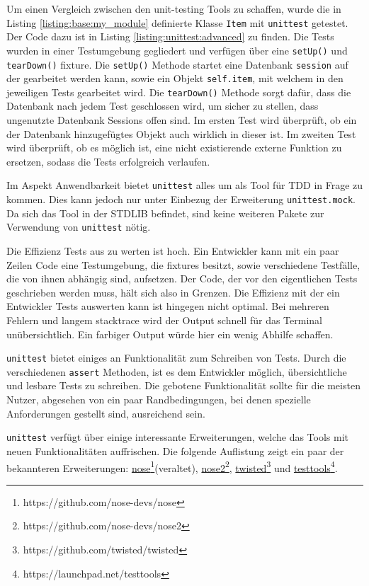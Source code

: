 Um einen Vergleich zwischen den unit-testing Tools zu schaffen, wurde die in
Listing \ref{listing:base:my_module} definierte Klasse \lstinline{Item} mit
\lstinline{unittest} getestet. Der Code dazu ist in Listing
\ref{listing:unittest:advanced} zu finden.
Die Tests wurden in einer Testumgebung gegliedert und verfügen über eine
\lstinline{setUp()} und \lstinline{tearDown()} \Gls{fixture}. Die
\lstinline{setUp()} Methode startet eine Datenbank \lstinline{session} auf der
gearbeitet werden kann, sowie ein Objekt \lstinline{self.item}, mit welchem in
den jeweiligen Tests gearbeitet wird. Die \lstinline{tearDown()} Methode
sorgt dafür, dass die Datenbank nach jedem Test geschlossen wird, um sicher zu 
stellen, dass ungenutzte Datenbank Sessions offen sind. Im ersten Test wird 
überprüft, ob ein der Datenbank hinzugefügtes Objekt auch wirklich in dieser 
ist. Im zweiten Test wird überprüft, ob es möglich ist, eine nicht existierende 
externe Funktion zu ersetzen, sodass die Tests erfolgreich verlaufen.
\newline

Im Aspekt Anwendbarkeit bietet \lstinline|unittest| alles um als Tool für TDD in
Frage zu kommen. Dies kann jedoch nur unter Einbezug der Erweiterung
\lstinline|unittest.mock|. Da sich das Tool in der STDLIB befindet, sind keine
weiteren Pakete zur Verwendung von \lstinline{unittest} nötig.

Die Effizienz Tests aus zu werten ist hoch. Ein Entwickler kann mit ein paar
Zeilen Code eine Testumgebung, die \Glspl{fixture} besitzt, sowie verschiedene 
Testfälle, die von ihnen abhängig sind, aufsetzen. Der Code, der vor den 
eigentlichen Tests geschrieben werden muss, hält sich also in Grenzen. Die
Effizienz mit der ein Entwickler Tests auswerten kann ist hingegen nicht 
optimal. Bei mehreren Fehlern und langem \gls{stacktrace} wird der Output 
schnell für das Terminal unübersichtlich. Ein farbiger Output 
würde hier 
ein wenig Abhilfe schaffen.

\lstinline{unittest} bietet einiges an Funktionalität zum Schreiben von Tests.
Durch die verschiedenen \lstinline{assert} Methoden, ist es dem Entwickler
möglich, übersichtliche und lesbare Tests zu schreiben. Die gebotene
Funktionalität sollte für die meisten Nutzer, abgesehen von ein paar
Randbedingungen, bei denen spezielle Anforderungen  gestellt sind, ausreichend 
sein.

\lstinline{unittest} verfügt über einige interessante Erweiterungen, welche das 
Tools mit neuen Funktionalitäten auffrischen. Die folgende Auflistung zeigt ein 
paar der bekannteren Erweiterungen: 
\href{https://github.com/nose-devs/nose}{nose}\footnote{https://github.com/nose-devs/nose}(veraltet),
\href{https://github.com/nose-devs/nose2}{nose2}\footnote{https://github.com/nose-devs/nose2},
\href{https://github.com/twisted/twisted}{twisted}\footnote{https://github.com/twisted/twisted}
und
\href{https://launchpad.net/testtools}{testtools}\footnote{https://launchpad.net/testtools}.